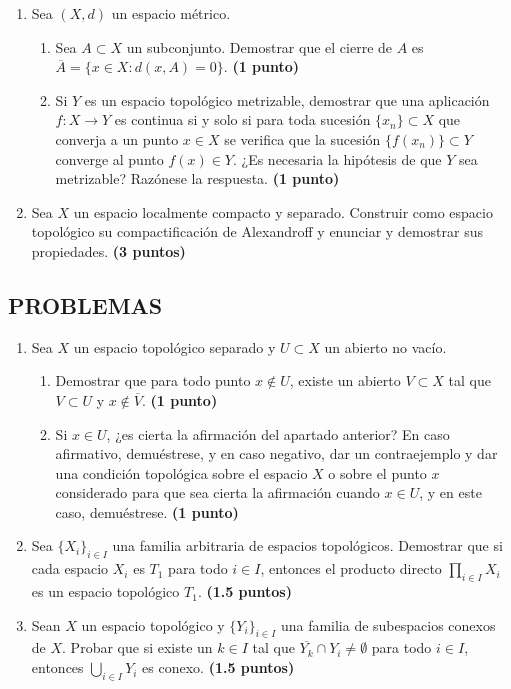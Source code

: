 \begin{enumerate}
    \item Sea $(X, d)$ un espacio métrico.
    \begin{enumerate}
        \item Sea $A \subset X$ un subconjunto. Demostrar que el cierre de $A$ es $\overline{A} = \{x \in X : d(x, A) = 0\}$.
        \hfill \textbf{(1 punto)}
        \item Si $Y$ es un espacio topológico metrizable, demostrar que una aplicación $f : X \to Y$ es continua si y solo si para toda sucesión $\{x_n\} \subset X$ que converja a un punto $x \in X$ se verifica que la sucesión $\{f(x_n)\} \subset Y$ converge al punto $f(x) \in Y$. ¿Es necesaria la hipótesis de que $Y$ sea metrizable? Razónese la respuesta.
        \hfill \textbf{(1 punto)}
    \end{enumerate}

    \item Sea $X$ un espacio localmente compacto y separado. Construir como espacio topológico su compactificación de Alexandroff y enunciar y demostrar sus propiedades.
    \hfill \textbf{(3 puntos)}
\end{enumerate}

\subsection*{PROBLEMAS}

\begin{enumerate}
    \item Sea $X$ un espacio topológico separado y $U \subset X$ un abierto no vacío.
    \begin{enumerate}
        \item Demostrar que para todo punto $x \notin U$, existe un abierto $V \subset X$ tal que $V \subset U$ y $x \notin \overline{V}$.
        \hfill \textbf{(1 punto)}
        \item Si $x \in U$, ¿es cierta la afirmación del apartado anterior? En caso afirmativo, demuéstrese, y en caso negativo, dar un contraejemplo y dar una condición topológica sobre el espacio $X$ o sobre el punto $x$ considerado para que sea cierta la afirmación cuando $x \in U$, y en este caso, demuéstrese.
        \hfill \textbf{(1 punto)}
    \end{enumerate}

    \item Sea $\{X_i\}_{i \in I}$ una familia arbitraria de espacios topológicos. Demostrar que si cada espacio $X_i$ es $T_1$ para todo $i \in I$, entonces el producto directo $\prod_{i \in I} X_i$ es un espacio topológico $T_1$.
    \hfill \textbf{(1.5 puntos)}

    \item Sean $X$ un espacio topológico y $\{Y_i\}_{i \in I}$ una familia de subespacios conexos de $X$. Probar que si existe un $k \in I$ tal que $\overline{Y_k} \cap Y_i \neq \emptyset$ para todo $i \in I$, entonces $\bigcup_{i \in I} Y_i$ es conexo.
    \hfill \textbf{(1.5 puntos)}
\end{enumerate}


